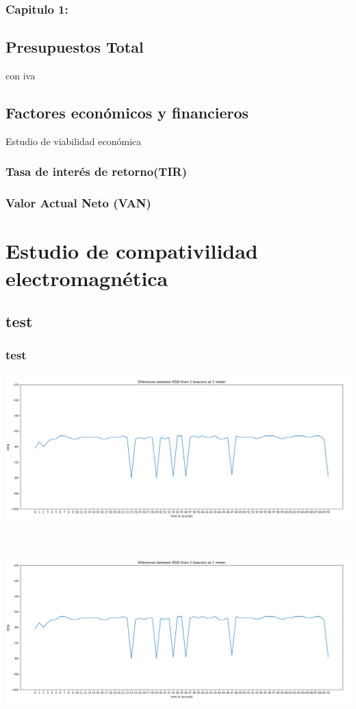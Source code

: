 \documentclass[a4paper ,12pt, onecolumn]{article}
\begin{document}
        \subsubsection{Capitulo 1: }
    \subsection{Presupuestos Total}
        con iva
    \subsection{Factores económicos y financieros}
    Estudio de viabilidad económica
        \subsubsection{Tasa de interés de retorno(TIR)}
        \subsubsection{Valor Actual Neto (VAN)}

\section{Estudio de compativilidad electromagnética}
\subsection{test}
\subsubsection{test}

\includegraphics[scale=0.3]{5min_beacon_rssi}
\includegraphics[width=15cm, height=8cm]{5min_beacon_rssi}
\end{document}
